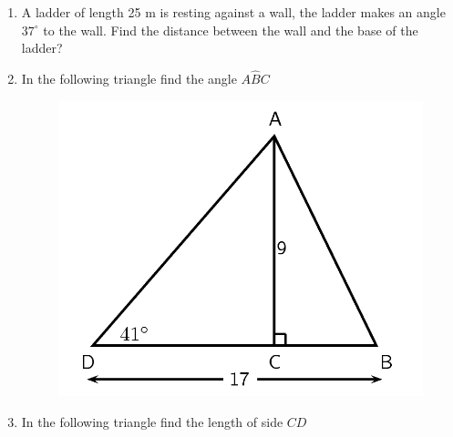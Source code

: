 \begin{enumerate}[noitemsep, label=\textbf{\arabic*}. ]
\label{m39414*uid104}\item A ladder of length 25 m is resting against a wall, the ladder makes an angle ${37}^{\circ }$ to the wall. Find the distance between the wall and the base of the ladder?\newline
\label{m39414*uid105}\item In the following triangle find the angle $A\hat{B}C$
    \setcounter{subfigure}{0}
	\begin{figure}[H] %
    \begin{center}
    \label{m39414*id92525!!!underscore!!!media}\label{m39414*id92525!!!underscore!!!printimage}\includegraphics{col11306.imgs/m39414_MG10C15_042.png} %
      \vspace{2pt}
    \vspace{.1in}
    \end{center}
 \end{figure}               \label{m39414*uid106}\item In the following triangle find the length of side $CD$
    \setcounter{subfigure}{0}
	\begin{figure}[H] %
    \begin{center}

\end{center}
\end{figure}
\end{enumerate}
